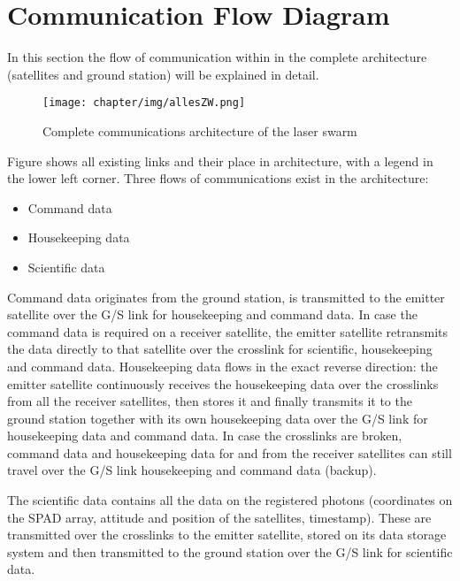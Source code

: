
\section{Communication Flow Diagram}

In this section the flow of communication within in the complete architecture (satellites and ground station) will be explained in detail.
\begin{figure}[ht]
\centering
\texttt{[image: chapter/img/allesZW.png]}
\caption{Complete communications architecture of the laser swarm}
\label{fig:allesZWW}
\end{figure}

Figure \cite{fig:allesZWW} shows all existing links and their place in architecture, with a legend in the lower left corner.
Three flows of communications exist in the architecture:
\begin{itemize}
\item Command data
\item Housekeeping data
\item Scientific data
\end{itemize}

Command data originates from the ground station, is transmitted to the emitter satellite over the G/S link for housekeeping and command data. In case the command data is required on a receiver satellite, the emitter satellite retransmits the data directly to that satellite over the crosslink for scientific, housekeeping and command data.
Housekeeping data flows in the exact reverse direction: the emitter satellite continuously receives the housekeeping data over the crosslinks from all the receiver satellites, then stores it and finally transmits it to the ground station together with its own housekeeping data over the G/S link for housekeeping data and command data.
In case the crosslinks are broken, command data and housekeeping data for and from the receiver satellites can still travel over the G/S link housekeeping and command data (backup).

The scientific data contains all the data on the registered photons (coordinates on the SPAD array, attitude and position of the satellites, timestamp). These are transmitted over the crosslinks to the emitter satellite, stored on its data storage system and then transmitted to the ground station over the G/S link for scientific data.